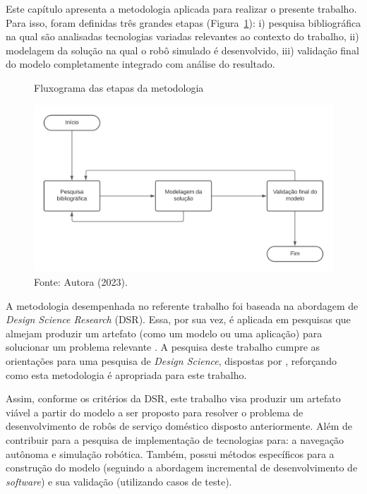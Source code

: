 
Este capítulo apresenta a metodologia aplicada para realizar o presente trabalho. Para isso, foram definidas três grandes etapas (Figura~\ref{fig:fluxogramaMetodologia}): i) pesquisa bibliográfica na qual são analisadas tecnologias variadas relevantes ao contexto do trabalho, ii) modelagem da solução na qual o robô simulado é desenvolvido, iii) validação final do modelo completamente integrado com análise do resultado. 

\begin{figure}[H]
    \centering
    \caption{Fluxograma das etapas da metodologia}
    \includegraphics[scale=0.8]{fluxogramaMetodologia.png}
    \caption*{Fonte: Autora (2023).}
    \label{fig:fluxogramaMetodologia}
\end{figure}

A metodologia desempenhada no referente trabalho foi baseada na abordagem de \textit{Design Science Research} (DSR). Essa, por sua vez, é aplicada em pesquisas que almejam produzir um artefato (como um modelo ou uma aplicação) para solucionar um problema relevante \cite{dsrBook:2015}. A pesquisa deste trabalho cumpre as orientações para uma pesquisa de \textit{Design Science}, dispostas por \citet{dsrIS:2004}, reforçando como esta metodologia é apropriada para este trabalho. 

Assim, conforme os critérios da DSR, este trabalho visa produzir um artefato viável a partir do modelo a ser proposto para resolver o problema de desenvolvimento de robôs de serviço doméstico disposto anteriormente. Além de contribuir para a pesquisa de implementação de tecnologias para: a navegação autônoma e simulação robótica. Também, possui métodos específicos para a construção do modelo (seguindo a abordagem incremental de desenvolvimento de \textit{software}) e sua validação (utilizando casos de teste).

